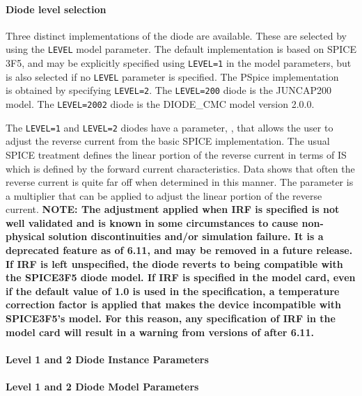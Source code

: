 \paragraph{Diode level selection}

Three distinct implementations of the diode are available.  These are
selected by using the \verb|LEVEL| model parameter.  The default
implementation is based on SPICE 3F5, and may be explicitly specified
using \verb|LEVEL=1| in the model parameters, but is also selected if no
\verb|LEVEL| parameter is specified.  The PSpice implementation
~\cite{PSpiceUG:1998} is obtained by specifying \verb|LEVEL=2|.
The \Xyce{} \verb|LEVEL=200| diode is the JUNCAP200 model.
The \Xyce{} \verb|LEVEL=2002| diode is the DIODE\_CMC model version 2.0.0.

The \Xyce{} \verb|LEVEL=1| and \verb|LEVEL=2| diodes have a parameter,
, that allows the user to adjust the reverse current from
the basic SPICE implementation.  The usual SPICE treatment defines the
linear portion of the reverse current in terms of IS which is defined
by the forward current characteristics.  Data shows that often the
reverse current is quite far off when determined in this manner.  The
parameter  is a multiplier that can be applied to adjust
the linear portion of the reverse current.  \textbf{NOTE: The
  adjustment applied when IRF is specified is not well validated and
  is known in some circumstances to cause non-physical solution
  discontinuities and/or simulation failure.  It is a deprecated
  feature as of \Xyce{} 6.11, and may be removed in a future release.
  If IRF is left unspecified, the diode reverts to being compatible
  with the SPICE3F5 diode model.  If IRF is specified in the model
  card, even if the default value of 1.0 is used in the specification,
  a temperature correction factor is applied that makes the device
  incompatible with SPICE3F5's model.  For this reason, any
  specification of IRF in the model card will result in a warning from
  versions of \Xyce{} after 6.11.}



\pagebreak

\paragraph{Level 1 and 2 Diode Instance Parameters}


\paragraph{Level 1 and 2 Diode Model Parameters}


